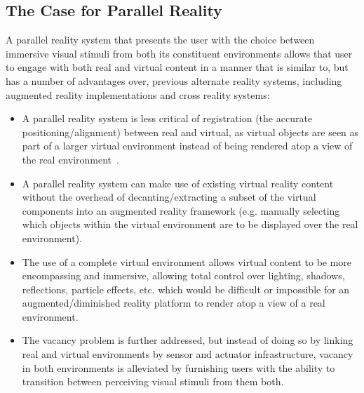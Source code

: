 
\subsection{The Case for Parallel Reality}
\label{caseforpr}

A parallel reality system that presents the user with the choice between immersive visual stimuli from both its constituent environments allows that user to engage with both real and virtual content in a manner that is similar to, but has a number of advantages over, previous alternate reality systems, including augmented reality implementations and cross reality systems:

\begin{itemize}
	\item A parallel reality system is less critical of registration (the accurate positioning/alignment) between real and virtual, as virtual objects are seen as part of a larger virtual environment instead of being rendered atop a view of the real environment~\cite{Azuma1997}.
	\item A parallel reality system can make use of existing virtual reality content without the overhead of decanting/extracting a subset of the virtual components into an augmented reality framework (e.g. manually selecting which objects within the virtual environment are to be displayed over the real environment).
	\item The use of a complete virtual environment allows virtual content to be more encompassing and immersive, allowing total control over lighting, shadows, reflections, particle effects, etc. which would be difficult or impossible for an augmented/diminished reality platform to render atop a view of a real environment.
	\item The vacancy problem is further addressed, but instead of doing so by linking real and virtual environments by sensor and actuator infrastructure, vacancy in both environments is alleviated by furnishing users with the ability to transition between perceiving visual stimuli from them both.
\end{itemize}

